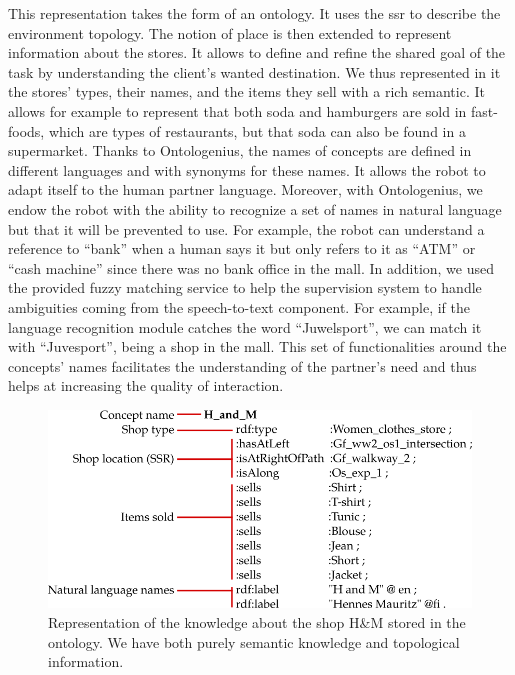 This representation takes the form of an ontology. It uses the \acrfull{ssr} to describe the environment topology. The notion of place is then extended to represent information about the stores. It allows to define and refine the shared goal of the task by understanding the client's wanted destination. We thus represented in it the stores' types, their names, and the items they sell with a rich semantic. It allows for example to represent that both soda and hamburgers are sold in fast-foods, which are types of restaurants, but that soda can also be found in a supermarket. Thanks to Ontologenius, the names of concepts are defined in different languages and with synonyms for these names. It allows the robot to adapt itself to the human partner language. Moreover, with Ontologenius, we endow the robot with the ability to recognize a set of names in natural language but that it will be prevented to use. For example, the robot can understand a reference to ``bank'' when a human says it but only refers to it as ``ATM'' or ``cash machine'' since there was no bank office in the mall. In addition, we used the provided fuzzy matching service to help the supervision system to handle ambiguities coming from the speech-to-text component. For example, if the language recognition module catches the word ``Juwelsport'', we can match it with ``Juvesport'', being a shop in the mall. This set of functionalities around the concepts' names facilitates the understanding of the partner's need and thus helps at increasing the quality of interaction.

\begin{figure}[ht!]
\centering
\includegraphics[scale=0.45]{figures/chapter8/zizzi.png}
\caption{\label{fig:chap8_zizzi} Representation of the knowledge about the shop H\&M stored in the ontology. We have both purely semantic knowledge and topological information. }
\end{figure}

